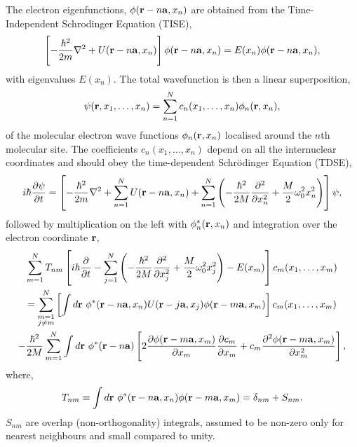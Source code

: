 The electron eigenfunctions, $\phi(\vb{r} - n\vb{a}, x_n)$ are obtained from the Time-Independent Schrodinger Equation (TISE),
\begin{equation}
    \left[-\frac{\hbar^2}{2m}\nabla^2 + U(\vb{r}-n\vb{a}, x_n)\right] \phi(\vb{r}-n\vb{a},x_n) = E(x_n)\phi(\vb{r}-n\vb{a},x_n),
\end{equation}
with eigenvalues $E(x_n)$. The total wavefunction is then a linear superposition,
\begin{equation}
    \psi(\vb{r},x_1, \dots, x_n) = \sum_{n=1}^N c_n(x_1, \dots, x_n) \phi_n(\vb{r},x_n),
\end{equation}
of the molecular electron wave functions $\phi_n(\vb{r},x_n)$ localised around the $n$th molecular site. The coefficients $c_n(x_1, \dots, x_n)$ depend on all the internuclear coordinates and should obey the time-dependent Schr\"odinger Equation (TDSE),
\begin{equation}
    i\hbar \frac{\partial \psi}{\partial t} = \left[-\frac{\hbar^2}{2m}\nabla^2 + \sum_{n=1}^N U(\vb{r}-n\vb{a},x_n) + \sum_{n=1}^N \left(-\frac{\hbar^2}{2M}\frac{\partial^2}{\partial x_n^2} + \frac{M}{2}\omega_0^2 x_n^2\right)\right] \psi,
\end{equation}
followed by multiplication on the left with $\phi_n^*(\vb{r},x_n)$ and integration over the electron coordinate $\vb{r}$,
\begin{equation}
\begin{gathered}
    \sum_{m=1}^N T_{nm} \left[ i\hbar \frac{\partial}{\partial t} - \sum_{j=1}^N \left(-\frac{\hbar^2}{2M}\frac{\partial^2}{\partial x_j^2} + \frac{M}{2}\omega_0^2 x_j^2 \right) -E(x_m) \right] c_m(x_1, \dots, x_m) \\ 
    = \sum_{\substack{m = 1 \\ j \neq m}}^N \left[ \int  d\vb{r}\ \phi^*(\vb{r}-n\vb{a},x_n) U(\vb{r}-j\vb{a},x_j)\phi(\vb{r}-m\vb{a},x_m) \right] c_m(x_1,\dots,x_m) \\
    - \frac{\hbar^2}{2M} \sum_{m=1}^N \int d\vb{r}\ \phi^*(\vb{r}-n\vb{a}) \left[ 2\frac{\partial\phi(\vb{r}-m\vb{a},x_m)}{\partial x_m}\frac{\partial c_m}{\partial x_m} + c_m \frac{\partial^2\phi(\vb{r}-m\vb{a},x_m)}{\partial x_m^2}\right],
\end{gathered}
\end{equation}
where,
\begin{equation}
    T_{nm} \equiv \int d\vb{r}\ \phi^*(\vb{r}-n\vb{a},x_n)\phi(\vb{r}-m\vb{a},x_m) = \delta_{nm} + S_{nm}.
\end{equation}
$S_{nm}$ are overlap (non-orthogonality) integrals, assumed to be non-zero only for nearest neighbours and small compared to unity.

